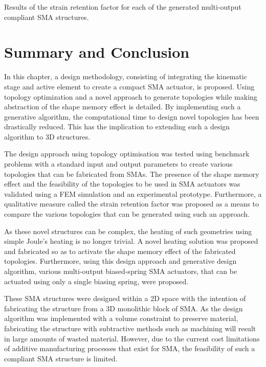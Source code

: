 \begin{table}[hbt!]
    \centering
    \caption{Results of the strain retention factor for each of the generated multi-output compliant SMA structures.}
    \label{tab:simo-results}
    
\end{table}



\section{Summary and Conclusion}
In this chapter, a design methodology, consisting of integrating the kinematic stage and active element to create a compact SMA actuator, is proposed. Using topology optimization and a novel approach to generate topologies while making abstraction of the shape memory effect is detailed. By implementing such a generative algorithm, the computational time to design novel topologies has been drastically reduced. This has the implication to extending such a design algorithm to 3D structures.

The design approach using topology optimisation was tested using benchmark problems with a standard input and output parameters to create various topologies that can be fabricated from SMAs. The presence of the shape memory effect and the feasibility of the topologies to be used in SMA actuators was validated using a FEM simulation and an experimental prototype. Furthermore, a qualitative measure called the strain retention factor was proposed as a means to compare the various topologies that can be generated using such an approach.

As these novel structures can be complex, the heating of such geometries using simple Joule's heating is no longer trivial. A novel heating solution was proposed and fabricated so as to activate the shape memory effect of the fabricated topologies. Furthermore, using this design approach and generative design algorithm, various multi-output biased-spring SMA actuators, that can be actuated using only a single biasing spring, were proposed.

These SMA structures were designed within a 2D space with the intention of fabricating the structure from a 3D monolithic block of SMA. As the design algorithm was implemented with a volume constraint to preserve material, fabricating the structure with subtractive methods such as machining will result in large amounts of wasted material. However, due to the current cost limitations of additive manufacturing processes that exist for SMA, the feasibility of such a compliant SMA structure is limited.

